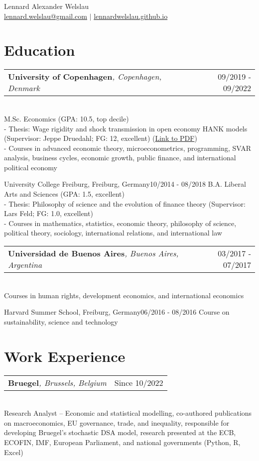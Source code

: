 \documentclass[A4,11pt]{article}
\makeatletter
\newcommand{\Subheading}[5]{   
    \begin{tabular*}{0.97\textwidth}[t]{l@{\extracolsep{\fill}}r}
      \textbf{#1}\textit{\small #2} & \small #3 
      \end{tabular*} \\
      \small #4 \\
    \vspace{7pt}
    }
\makeatother
\begin{document}
\begin{center}
    {\Large Lennard Alexander Welslau} \\ 
    \href{mailto:lennard.welslau@gmail.com}{lennard.welslau@gmail.com} $|$ \href{https://lennardwelslau.github.io/}{lennardwelslau.github.io}

\end{center}


\section{Education}
    \Subheading
        {University of Copenhagen}{, Copenhagen, Denmark}{09/2019 - 09/2022}
        {M.Sc. Economics (GPA: 10.5, top decile) \\
        - Thesis: Wage rigidity and shock transmission in open economy HANK models (Supervisor: Jeppe Druedahl; FG: 12, excellent) (\href{https://lennardwelslau.github.io/research/Welslau_MA_Thesis_2022_Wage_Flexibility_Open_Economy_HANK.pdf}{Link to PDF})\\
        - Courses in advanced economic theory, microeconometrics, programming, SVAR analysis, business cycles, economic growth, public finance, and international political economy} 

    \Subheading
        {University College Freiburg}{, Freiburg, Germany}{10/2014 - 08/2018}
        {B.A. Liberal Arts and Sciences (GPA: 1.5, excellent) \\
        - Thesis: Philosophy of science and the evolution of finance theory (Supervisor: Lars Feld; FG: 1.0, excellent) \\
        - Courses in mathematics, statistics, economic theory, philosophy of science, political theory, sociology, international relations, and international law}

    \Subheading
        {Universidad de Buenos Aires}{, Buenos Aires, Argentina}{03/2017 - 07/2017}
        {Courses in human rights, development economics, and international economics}

    \Subheading
        {Harvard Summer School}{, Freiburg, Germany}{06/2016 - 08/2016}
        {Course on sustainability, science and technology}

\section{Work Experience}
    \Subheading
        {Bruegel}{, Brussels, Belgium}{Since 10/2022}
        {Research Analyst -- Economic and statistical modelling, 
        co-authored publications on macroeconomics, EU governance, trade, and inequality,
        responsible for developing Bruegel's stochastic DSA model,
        research presented at the ECB, ECOFIN, IMF, European Parliament, and national governments (Python, R, Excel)}{}
\end{document}
